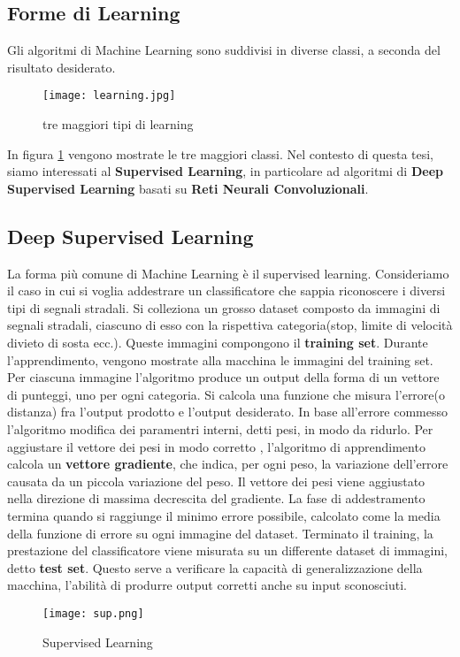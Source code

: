 \subsection{Forme di Learning}
Gli algoritmi di Machine Learning sono suddivisi in diverse classi, a seconda del risultato desiderato.
\begin{figure}
  \texttt{[image: learning.jpg]}
  \caption{tre maggiori tipi di learning\cite{learn}}
  \label{fig:ml}
\end{figure}
In figura \ref{fig:ml} vengono mostrate le tre maggiori classi. Nel contesto di questa tesi, siamo interessati  al \textbf{Supervised Learning}, in particolare
ad algoritmi di \textbf{Deep Supervised Learning} basati su \textbf{Reti Neurali Convoluzionali}.
\subsection{Deep Supervised Learning}
La forma più comune di Machine Learning è il supervised learning. Consideriamo il caso in cui si voglia addestrare un classificatore
che sappia riconoscere i diversi tipi di segnali stradali. Si colleziona un grosso dataset composto da immagini di segnali stradali, ciascuno di esso con la rispettiva categoria(stop, limite di velocità
divieto di sosta ecc.). Queste immagini compongono il \textbf{training set}. Durante l'apprendimento, vengono mostrate alla macchina  le immagini del training set. Per ciascuna immagine l'algoritmo produce un output della forma di un vettore di punteggi, uno per ogni categoria.
Si calcola una funzione che misura l'errore(o distanza) fra l'output prodotto e l'output desiderato. In base all'errore commesso l'algoritmo modifica dei paramentri interni, detti pesi, 
in modo da ridurlo. Per aggiustare il vettore dei pesi in modo corretto , l'algoritmo di apprendimento calcola un \textbf{vettore gradiente}, che indica, per ogni peso, la variazione dell'errore
causata da un piccola variazione del peso. Il vettore dei pesi viene aggiustato nella direzione di massima decrescita del gradiente. La fase di addestramento termina quando si raggiunge il minimo errore possibile, calcolato come la media della funzione di errore su ogni immagine del dataset.
Terminato il training, la prestazione del classificatore viene misurata su un differente dataset di immagini, detto \textbf{test set}. Questo serve a verificare
la capacità di generalizzazione della macchina, l'abilità di produrre output corretti anche su input sconosciuti.

\begin{figure}
  \texttt{[image: sup.png]}
  \caption{Supervised Learning\cite{sup}}
  \label{fig:sup}
\end{figure}

